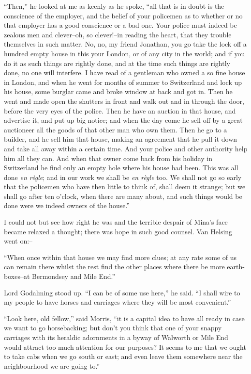 \documentclass[12pt,openright]{book}
\begin{document}
“Then,” he looked at me as keenly as he spoke, “all that is in doubt is the conscience of the employer, and the belief of your policemen as to whether or no that employer has a good conscience or a bad one. Your police must indeed be zealous men and clever–oh, so clever!–in reading the heart, that they trouble themselves in such matter. No, no, my friend Jonathan, you go take the lock off a hundred empty house in this your London, or of any city in the world; and if you do it as such things are rightly done, and at the time such things are rightly done, no one will interfere. I have read of a gentleman who owned a so fine house in London, and when he went for months of summer to Switzerland and lock up his house, some burglar came and broke window at back and got in. Then he went and made open the shutters in front and walk out and in through the door, before the very eyes of the police. Then he have an auction in that house, and advertise it, and put up big notice; and when the day come he sell off by a great auctioneer all the goods of that other man who own them. Then he go to a builder, and he sell him that house, making an agreement that he pull it down and take all away within a certain time. And your police and other authority help him all they can. And when that owner come back from his holiday in Switzerland he find only an empty hole where his house had been. This was all done \textit{en règle}; and in our work we shall be \textit{en règle} too. We shall not go so early that the policemen who have then little to think of, shall deem it strange; but we shall go after ten o’clock, when there are many about, and such things would be done were we indeed owners of the house.”

I could not but see how right he was and the terrible despair of Mina’s face became relaxed a thought; there was hope in such good counsel. Van Helsing went on:–

“When once within that house we may find more clues; at any rate some of us can remain there whilst the rest find the other places where there be more earth-boxes–at Bermondsey and Mile End.”

Lord Godalming stood up. “I can be of some use here,” he said. “I shall wire to my people to have horses and carriages where they will be most convenient.”

“Look here, old fellow,” said Morris, “it is a capital idea to have all ready in case we want to go horsebacking; but don’t you think that one of your snappy carriages with its heraldic adornments in a byway of Walworth or Mile End would attract too much attention for our purposes? It seems to me that we ought to take cabs when we go south or east; and even leave them somewhere near the neighbourhood we are going to.”
\end{document}
